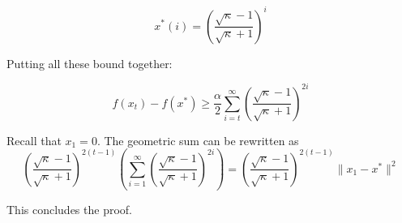 \begin{equation}
x^*(i) = \left( \frac{\sqrt{\kappa} - 1}{\sqrt{\kappa} +1} \right)^i 
\end{equation}

Putting all these bound together:

\begin{equation}
f(x_t) - f(x^*) \geq \frac{\alpha}{2}\sum_{i=t}^\infty \left( \frac{\sqrt{\kappa} - 1}{\sqrt{\kappa} +1} \right)^{2i} 
\end{equation}

Recall that $x_1 =0$. The geometric sum can be rewritten as 
\begin{equation}
\left( \frac{\sqrt{\kappa} - 1}{\sqrt{\kappa} +1} \right)^{2(t-1)} \left( \sum_{i=1}^\infty \left( \frac{\sqrt{\kappa} - 1}{\sqrt{\kappa} +1} \right)^{2i} \right) = \left( \frac{\sqrt{\kappa} - 1}{\sqrt{\kappa} +1} \right)^{2(t-1)} \parallel x_1 - x^* \parallel^2
\end{equation}

This concludes the proof.

\proofend



